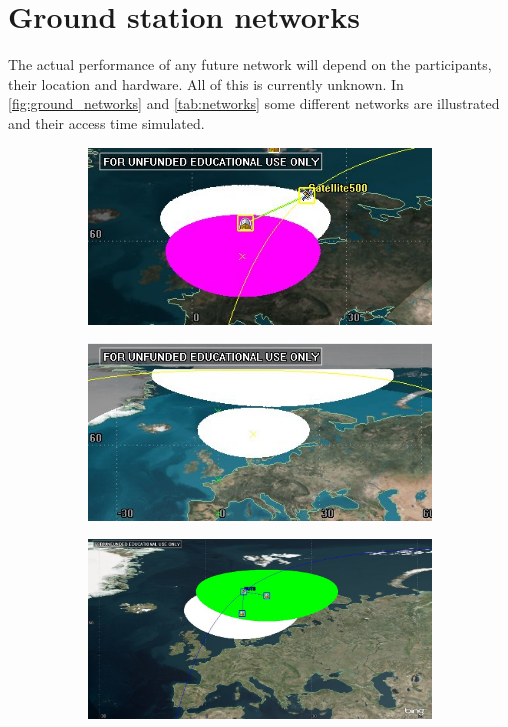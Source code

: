 \section{Ground station networks}

The actual performance of any future network will depend on the participants, their location and hardware. All of this is currently unknown. In \autoref{fig:ground_networks} and \autoref{tab:networks} some different networks are illustrated and their access time simulated.

\begin{figure}
\begin{subfigure}{.5\textwidth}
	\centering
	\includegraphics[width=\textwidth]{Figures/range_ntnu_aalborg}
	\label{fig:range_ntnu_aalborg}
\end{subfigure}
\begin{subfigure}{.5\textwidth}
	\centering
	\includegraphics[width=\textwidth]{Figures/range_ntnu_svalbard}
	\label{fig:range_ntnu_unis}
\end{subfigure}
\begin{subfigure}{.5\textwidth}
	\centering
	\includegraphics[width=\textwidth]{Figures/range_ntnu_narvik}

\end{subfigure}
\end{figure}
